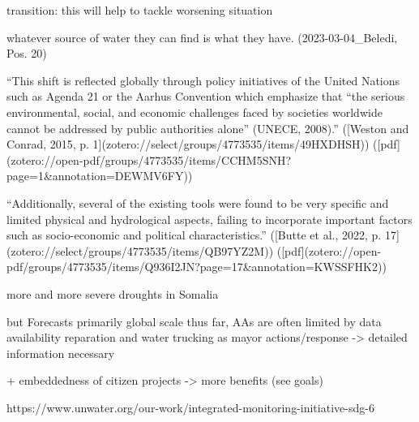 


transition: this will help to tackle worsening situation

whatever source of water they can find is what they have. (2023-03-04_Beledi, Pos. 20)


“This shift is reflected globally through policy initiatives of the United Nations such as Agenda 21 or the Aarhus Convention which emphasize that “the serious environmental, social, and economic challenges faced by societies worldwide cannot be addressed by public authorities alone” (UNECE, 2008).” ([Weston and Conrad, 2015, p. 1](zotero://select/groups/4773535/items/49HXDHSH)) ([pdf](zotero://open-pdf/groups/4773535/items/CCHM5SNH?page=1&annotation=DEWMV6FY))

“Additionally, several of the existing tools were found to be very specific and limited physical and hydrological aspects, failing to incorporate important factors such as socio-economic and political characteristics.” ([Butte et al., 2022, p. 17](zotero://select/groups/4773535/items/QB97YZ2M)) ([pdf](zotero://open-pdf/groups/4773535/items/Q936I2JN?page=17&annotation=KWSSFHK2))

more and more severe droughts in Somalia

but Forecasts primarily global scale
thus far, AAs are often limited by data availability
reparation and water trucking as mayor actions/response -> detailed information necessary

+ embeddedness of citizen projects -> more benefits (see goals)



https://www.unwater.org/our-work/integrated-monitoring-initiative-sdg-6

